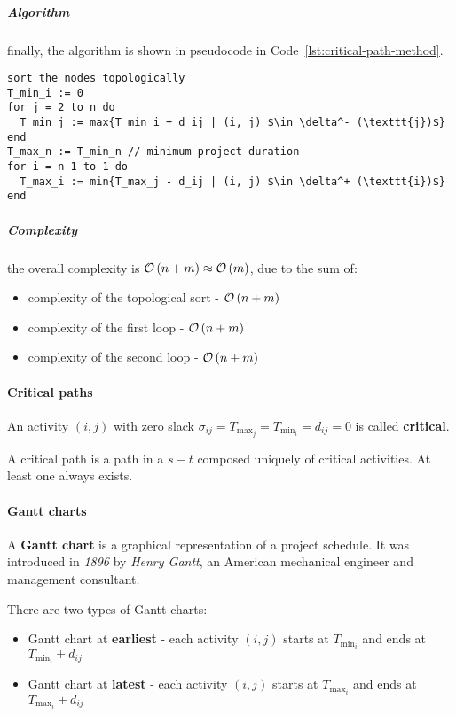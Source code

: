 \documentclass[english]{article}
\begin{document}
\subparagraph*{Algorithm}
finally, the algorithm is shown in pseudocode in Code~\ref{lst:critical-path-method}.

\begin{lstlisting}[caption={Critical path method}, label={lst:critical-path-method}, float]
sort the nodes topologically
T_min_i := 0
for j = 2 to n do
  T_min_j := max{T_min_i + d_ij | (i, j) $\in \delta^- (\texttt{j})$}
end
T_max_n := T_min_n // minimum project duration
for i = n-1 to 1 do
  T_max_i := min{T_max_j - d_ij | (i, j) $\in \delta^+ (\texttt{i})$}
end
\end{lstlisting}

\subparagraph*{Complexity}
the overall complexity is \(\mathcal{O}\left(n+m\right) \approx \mathcal{O}\left(m\right)\), due to the sum of:

\begin{itemize}
  \item complexity of the topological sort - \(\mathcal{O}\left(n+m\right)\)
  \item complexity of the first loop - \(\mathcal{O}\left(n+m\right)\)
  \item complexity of the second loop - \(\mathcal{O}\left(n+m\right)\)
\end{itemize}

\paragraph{Critical paths}

An activity \(\left( i, j \right)\) with zero slack \(\sigma_{ij} = T_{\max_j} = T_{\min_i} = d_{ij} = 0\) is called \textbf{critical}.

A critical path is a path in a \(s-t\) composed uniquely of critical activities.
At least one always exists.

\paragraph{Gantt charts}

A \textbf{Gantt chart} is a graphical representation of a project schedule.
It was introduced in \textit{1896} by \textit{Henry Gantt}, an American mechanical engineer and management consultant.

There are two types of Gantt charts:

\begin{itemize}
  \item Gantt chart at \textbf{earliest} - each activity \(\left( i, j \right)\) starts at \(T_{\min_i}\) and ends at \(T_{\min_i} + d_{ij}\)
  \item Gantt chart at \textbf{latest} - each activity \(\left( i, j \right)\) starts at \(T_{\max_i}\) and ends at \(T_{\max_i} + d_{ij}\)
\end{itemize}
\end{document}
